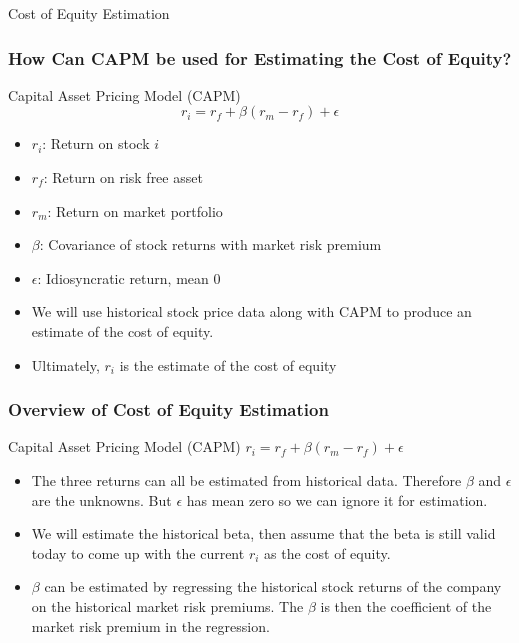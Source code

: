 \documentclass[handout, 11pt]{beamer}
\begin{document}
\begin{section}[Equity]{Cost of Equity Estimation}
\begin{frame}
\frametitle{How Can CAPM be used for Estimating the Cost of Equity?}
\small
\begin{block}{Capital Asset Pricing Model (CAPM)}
\begin{equation}
	r_i = r_f + \beta (r_m - r_f) + \epsilon
\end{equation}
\vspace{-0.3cm}
\begin{itemize}
\item $r_i$: Return on stock $i$
\item $r_f$: Return on risk free asset
\item $r_m$: Return on market portfolio
\item $\beta$: Covariance of stock returns with market risk premium
\item $\epsilon$: Idiosyncratic return, mean 0
\end{itemize}
\end{block}
\begin{itemize}
\item We will use historical stock price data along with CAPM to produce an estimate of the cost of equity.
\vfill
\item Ultimately, $r_i$ is the estimate of the cost of equity
\end{itemize}
\end{frame}
\begin{frame}
\frametitle{Overview of Cost of Equity Estimation}
\begin{block}{Capital Asset Pricing Model (CAPM)}
$r_i = r_f + \beta (r_m - r_f) + \epsilon$
\end{block}
\begin{itemize}
\item The three returns can all be estimated from historical data. Therefore $\beta$ and $\epsilon$ are the unknowns. But $\epsilon$ has mean zero so we can ignore it for estimation.
\vfill
\item We will estimate the historical beta, then assume that the beta is still valid today to come up with the current $r_i$ as the cost of equity.
\vfill
\item $\beta$ can be estimated by regressing the historical stock returns of the company on the historical market risk premiums. The $\beta$ is then the coefficient of the market risk premium in the regression.
\end{itemize}

\end{frame}
\end{section}
\end{document}
